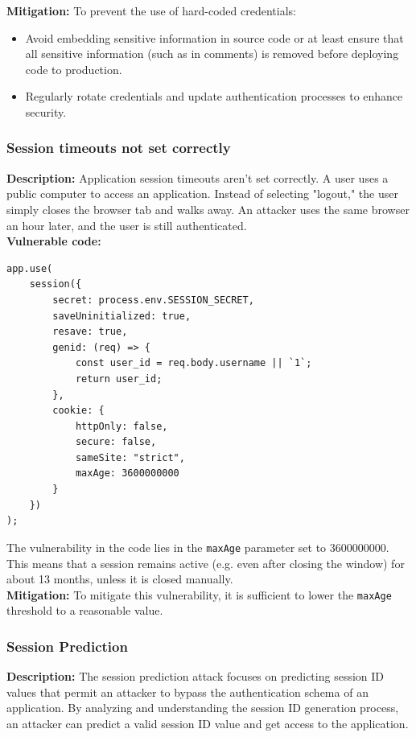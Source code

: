 \documentclass[]{article}
\begin{document}
\textbf{Mitigation:}
To prevent the use of hard-coded credentials:
\begin{itemize}
    \item Avoid embedding sensitive information in source code or at least ensure that all sensitive information (such as in comments) is removed before deploying code to production.
    \item Regularly rotate credentials and update authentication processes to enhance security.
\end{itemize}

\subsubsection{Session timeouts not set correctly}
\textbf{Description:} Application session timeouts aren't set correctly. A user uses a public computer to access an application. Instead of selecting "logout," the user simply closes the browser tab and walks away. An attacker uses the same browser an hour later, and the user is still authenticated. \\
\textbf{Vulnerable code:} 
\begin{lstlisting}
app.use(
    session({
        secret: process.env.SESSION_SECRET,
        saveUninitialized: true,
        resave: true,
        genid: (req) => {
            const user_id = req.body.username || `1`;
            return user_id;
        },
        cookie: {
            httpOnly: false,
            secure: false,
            sameSite: "strict",
            maxAge: 3600000000
        }
    })
);
\end{lstlisting}
The vulnerability in the code lies in the \texttt{maxAge} parameter set to 3600000000. This means that a session remains active (e.g. even after closing the window) for about 13 months, unless it is closed manually.
\\ \textbf{Mitigation:} To mitigate this vulnerability, it is sufficient to lower the \texttt{maxAge} threshold to a reasonable value.

\subsubsection{Session Prediction}

\textbf{Description:} The session prediction attack focuses on predicting session ID values that permit an attacker to bypass the authentication schema of an application. By analyzing and understanding the session ID generation process, an attacker can predict a valid session ID value and get access to the application.
\end{document}
